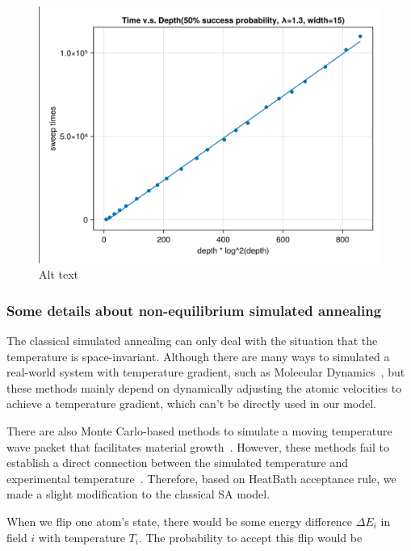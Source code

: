 \documentclass[twocolumn,superscriptaddress,english,showpacs,longbibliography]{revtex4-2}
\begin{document}
\begin{figure}
\centering
\includegraphics[width=\columnwidth]{../notes/images/toy_model_wave_packet_time_vs_depth_1_3.png}
\caption{Alt text}
\end{figure}

\subsubsection{Some details about non-equilibrium simulated
annealing}\label{some-details-about-non-equilibrium-simulated-annealing}

The classical simulated annealing can only deal with the situation that
the temperature is space-invariant. Although there are many ways to
simulated a real-world system with temperature gradient, such as
Molecular Dynamics~\cite{Bai2015, Deng2006}, but
these methods mainly depend on dynamically adjusting the atomic
velocities to achieve a temperature gradient, which can't be directly
used in our model.

There are also Monte Carlo-based methods to simulate a moving
temperature wave packet that facilitates material growth~\cite{Godfrey1995, Tan2017}.
However, these methods fail to establish a direct connection between the simulated temperature and experimental
temperature~\cite{Zollner2014}.
Therefore, based on HeatBath acceptance rule, we made a slight modification to the classical SA model.

When we flip one atom's state, there would be some energy difference
$\Delta E_{i}$ in field $i$ with temperature $T_i$. The
probability to accept this flip would be
\end{document}
